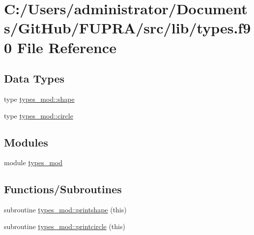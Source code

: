 \hypertarget{types_8f90}{}\section{C\+:/\+Users/administrator/\+Documents/\+Git\+Hub/\+F\+U\+P\+R\+A/src/lib/types.f90 File Reference}
\label{types_8f90}
\subsection*{Data Types}
\begin{DoxyCompactItemize}
\item 
type \hyperlink{structtypes__mod_1_1shape}{types\+\_\+mod\+::shape}
\item 
type \hyperlink{structtypes__mod_1_1circle}{types\+\_\+mod\+::circle}
\end{DoxyCompactItemize}
\subsection*{Modules}
\begin{DoxyCompactItemize}
\item 
module \hyperlink{namespacetypes__mod}{types\+\_\+mod}
\end{DoxyCompactItemize}
\subsection*{Functions/\+Subroutines}
\begin{DoxyCompactItemize}
\item 
subroutine \hyperlink{namespacetypes__mod_ab09448209b0b127b46bc8fa8bf29b739}{types\+\_\+mod\+::printshape} (this)
\item 
subroutine \hyperlink{namespacetypes__mod_ae45a0e69dfbf27364378a9d1e7f71f99}{types\+\_\+mod\+::printcircle} (this)
\end{DoxyCompactItemize}
